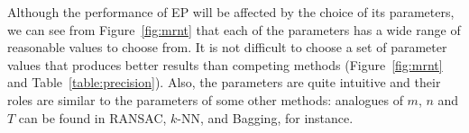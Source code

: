 \documentclass[preprint,12pt,3p]{elsarticle}
\begin{document}
Although the performance of EP will be affected by the choice of its
parameters, we can see from Figure~\ref{fig:mrnt} that each of the
parameters has a wide range of reasonable values to choose from. It is
not difficult to choose a set of parameter values that produces better
results than competing methods (\cf Figure~\ref{fig:mrnt} and
Table~\ref{table:precision}).  Also, the parameters are quite
intuitive and their roles are similar to the parameters of some
other methods: analogues of $m$, $n$ and $T$ can be found in
RANSAC, $k$-NN, and Bagging, for instance.

\end{document}
